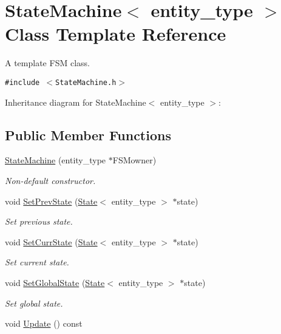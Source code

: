 \hypertarget{class_state_machine}{
\section{StateMachine$<$ entity\_\-type $>$ Class Template Reference}
\label{class_state_machine}
}
A template FSM class.  


{\tt \#include $<$StateMachine.h$>$}

Inheritance diagram for StateMachine$<$ entity\_\-type $>$:\subsection*{Public Member Functions}
\begin{CompactItemize}
\item 
\hyperlink{class_state_machine_4a60d2af8f9977d4f5cf2e9e18b93eae}{StateMachine} (entity\_\-type $\ast$FSMowner)
\begin{CompactList}\small\item\em Non-default constructor. \item\end{CompactList}\item 
void \hyperlink{class_state_machine_7563575ae8101c257dee16be4b196b3d}{SetPrevState} (\hyperlink{class_state}{State}$<$ entity\_\-type $>$ $\ast$state)
\begin{CompactList}\small\item\em Set previous state. \item\end{CompactList}\item 
void \hyperlink{class_state_machine_9411020a1ab0a925142bf615550a034d}{SetCurrState} (\hyperlink{class_state}{State}$<$ entity\_\-type $>$ $\ast$state)
\begin{CompactList}\small\item\em Set current state. \item\end{CompactList}\item 
void \hyperlink{class_state_machine_1236ff308ac7428c32703a5f77cbf3d7}{SetGlobalState} (\hyperlink{class_state}{State}$<$ entity\_\-type $>$ $\ast$state)
\begin{CompactList}\small\item\em Set global state. \item\end{CompactList}\item 
void \hyperlink{class_state_machine_24b1f38171537058ab8040b3b42adb6c}{Update} () const 

\end{CompactItemize}
